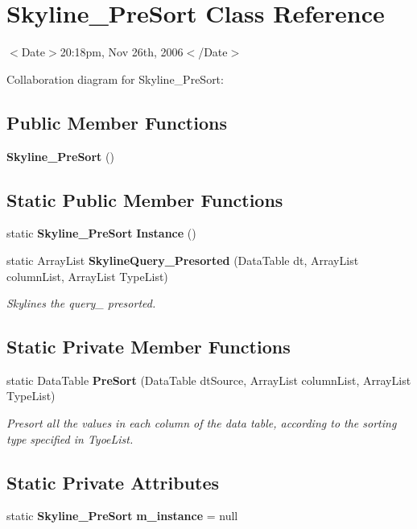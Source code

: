 \section{Skyline\_\-Pre\-Sort Class Reference}
\label{class_skyline___pre_sort}
$<$Date$>$20:18pm, Nov 26th, 2006$<$/Date$>$  


Collaboration diagram for Skyline\_\-Pre\-Sort:\subsection*{Public Member Functions}
\begin{CompactItemize}
\item 
{\bf Skyline\_\-Pre\-Sort} ()
\end{CompactItemize}
\subsection*{Static Public Member Functions}
\begin{CompactItemize}
\item 
static {\bf Skyline\_\-Pre\-Sort} {\bf Instance} ()
\item 
static Array\-List {\bf Skyline\-Query\_\-Presorted} (Data\-Table dt, Array\-List column\-List, Array\-List Type\-List)
\begin{CompactList}\small\item\em Skylines the query\_\- presorted. \item\end{CompactList}\end{CompactItemize}
\subsection*{Static Private Member Functions}
\begin{CompactItemize}
\item 
static Data\-Table {\bf Pre\-Sort} (Data\-Table dt\-Source, Array\-List column\-List, Array\-List Type\-List)
\begin{CompactList}\small\item\em Presort all the values in each column of the data table, according to the sorting type specified in Tyoe\-List. \item\end{CompactList}\end{CompactItemize}
\subsection*{Static Private Attributes}
\begin{CompactItemize}
\item 
static {\bf Skyline\_\-Pre\-Sort} {\bf m\_\-instance} = null
\end{CompactItemize}


